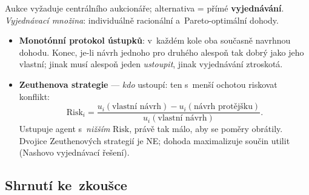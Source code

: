 \documentclass[11pt,a4paper]{article}
\theoremstyle{definition}
\begin{document}
\begin{defbox}
Aukce vyžaduje centrálního aukcionáře; alternativa = přímé \textbf{vyjednávání}.
\emph{Vyjednávací množina}: individuálně racionální a~Pareto-optimální dohody.
\begin{itemize}
\item \textbf{Monotónní protokol ústupků}: v~každém kole oba současně navrhnou dohodu. Konec,
  je-li návrh jednoho pro druhého alespoň tak dobrý jako jeho vlastní; jinak musí alespoň jeden
  \emph{ustoupit}, jinak vyjednávání ztroskotá.
\item \textbf{Zeuthenova strategie} --- \emph{kdo} ustoupí: ten s~menší ochotou riskovat
  konflikt:
  \[
  \mathrm{Risk}_i = \frac{u_i(\text{vlastní návrh}) - u_i(\text{návrh protějšku})}
  {u_i(\text{vlastní návrh})} .
  \]
  Ustupuje agent s~\emph{nižším} $\mathrm{Risk}$, právě tak málo, aby se poměry obrátily.
  Dvojice Zeuthenových strategií je NE; dohoda maximalizuje součin utilit (Nashovo
  vyjednávací řešení).
\end{itemize}
\end{defbox}

\subsection{Shrnutí ke~zkoušce}
\end{document}
